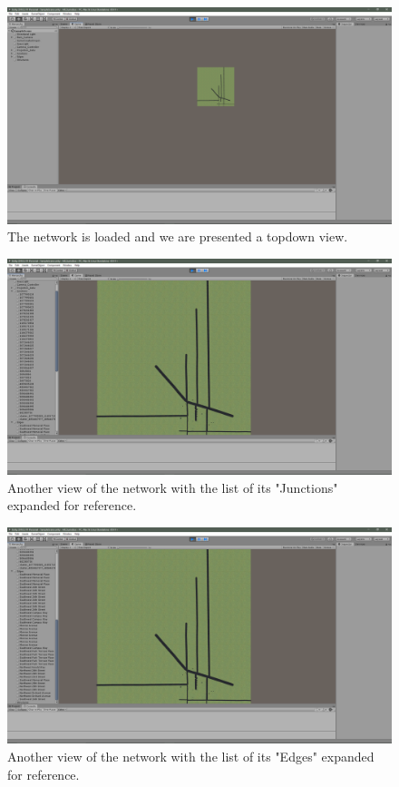 \documentclass[letterpaper, 10pt, onecolumn, draftclsnofoot]{IEEEtran}
\begin{document}
\vspace{3pt}
\begin{figure}[h!]
    \includegraphics[width=\textwidth]{ViewAfterBuild_12}
    \caption{The network is loaded and we are presented a topdown view.}
    \label{fig:my_label}
\end{figure}
\vspace{3pt}
\begin{figure}[h!]
    \includegraphics[width=\textwidth]{CloseupJunctions_13}
    \caption{Another view of the network with the list of its "Junctions" expanded for reference.}
    \label{fig:my_label}
\end{figure}
\vspace{3pt}
\begin{figure}[h!]
    \includegraphics[width=\textwidth]{CloseupEdges_14}
    \caption{Another view of the network with the list of its "Edges" expanded for reference.}
    \label{fig:my_label}
\end{figure}
    
\end{document}

